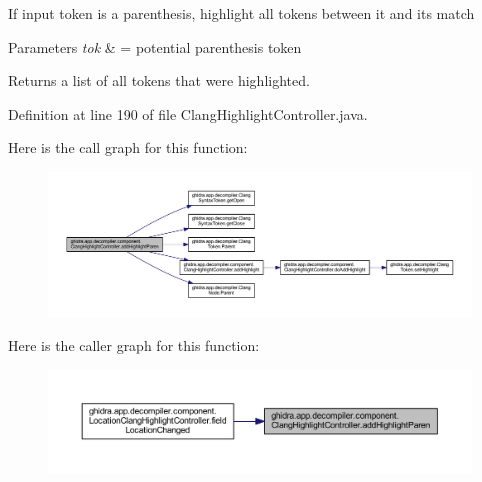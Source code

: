 If input token is a parenthesis, highlight all tokens between it and its match 
\begin{DoxyParams}{Parameters}
{\em tok} & = potential parenthesis token \\
\hline
\end{DoxyParams}
\begin{DoxyReturn}{Returns}
a list of all tokens that were highlighted. 
\end{DoxyReturn}


Definition at line 190 of file Clang\+Highlight\+Controller.\+java.

Here is the call graph for this function\+:
\nopagebreak
\begin{figure}[H]
\begin{center}
\leavevmode
\includegraphics[width=350pt]{classghidra_1_1app_1_1decompiler_1_1component_1_1_clang_highlight_controller_a6a321654fc1984f10228d9fba4527da1_cgraph}
\end{center}
\end{figure}
Here is the caller graph for this function\+:
\nopagebreak
\begin{figure}[H]
\begin{center}
\leavevmode
\includegraphics[width=350pt]{classghidra_1_1app_1_1decompiler_1_1component_1_1_clang_highlight_controller_a6a321654fc1984f10228d9fba4527da1_icgraph}
\end{center}
\end{figure}
\mbox{\label{classghidra_1_1app_1_1decompiler_1_1component_1_1_clang_highlight_controller_a1f995ddaa7172fc70cffc4f408882c05}} 
